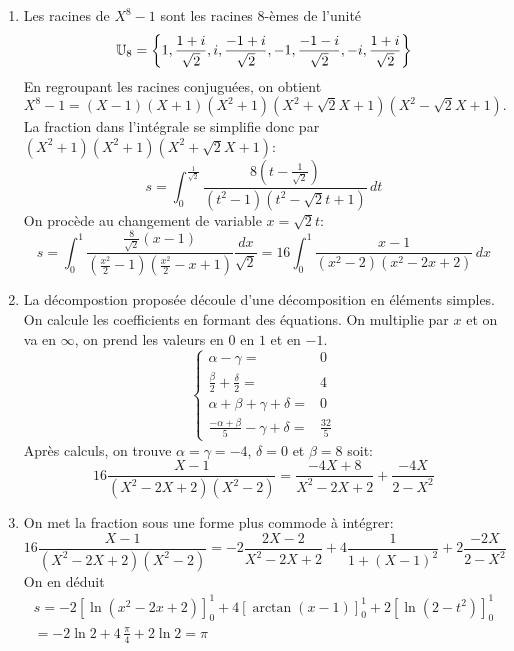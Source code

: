 \begin{enumerate}
 \item Les racines de $X^8 - 1$ sont les racines $8$-èmes de l'unité
\begin{displaymath}
 \mathbb{U}_8 = \left\lbrace 1, \frac{1+i}{\sqrt{2}}, i , \frac{-1+i}{\sqrt{2}}, -1, 
 \frac{-1-i}{\sqrt{2}}, -i, \frac{1+i}{\sqrt{2}}
 \right\rbrace 
\end{displaymath}
En regroupant les racines conjuguées, on obtient
\begin{displaymath}
 X^8 -1 = (X-1)(X+1)(X^2+1)(X^2 + \sqrt{2} X +1)(X^2 - \sqrt{2} X +1).
\end{displaymath}
La fraction dans l'intégrale se simplifie donc par $(X^2+1)(X^2+1)(X^2 + \sqrt{2} X +1)$:
\begin{displaymath}
 s=
\int_{0}^{\frac{1}{\sqrt{2}}} \frac{8(t-\frac{1}{\sqrt{2}})}{(t^2-1)(t^2 - \sqrt{2} t +1)}\,dt
\end{displaymath}
On procède au changement de variable $x = \sqrt{2}t$:
\begin{displaymath}
 s = \int_0^1 \frac{\frac{8}{\sqrt{2}}(x-1)}{(\frac{x^2}{2}-1)(\frac{x^2}{2} - x +1)}\frac{dx}{\sqrt{2}}
 = 16 \int_0^1 \frac{x-1}{(x^2-2)(x^2 -2x +2)}\,dx
\end{displaymath}

 \item La décompostion proposée découle d'une décomposition en éléments simples. On calcule les coefficients en formant des équations.
On multiplie par $x$ et on va en $\infty$, on prend les valeurs en $0$ en $1$ et en $-1$.
\begin{displaymath}
 \left\lbrace 
 \begin{aligned}
  \alpha - \gamma =& 0 \\
  \frac{\beta}{2} + \frac{\delta}{2} =& 4 \\
  \alpha + \beta + \gamma + \delta =& 0 \\
  \frac{-\alpha + \beta}{5} - \gamma + \delta =& \frac{32}{5}
 \end{aligned}
\right. 
\end{displaymath}
 Après calculs, on trouve $\alpha = \gamma = -4$, $\delta = 0$ et $\beta =8$ soit:
\begin{displaymath}
 16\frac{X - 1}{(X^2 - 2X + 2)(X^2 - 2)} = 
 \frac{-4 X +8}{X^2 - 2X + 2} 
 + \frac{-4 X }{2-X^2} 
\end{displaymath}

 \item On met la fraction sous une forme plus commode à intégrer:
\begin{displaymath}
 16\frac{X - 1}{(X^2 - 2X + 2)(X^2 - 2)} = 
 -2\frac{ 2X - 2}{X^2 - 2X + 2} + 4\frac{1}{1+(X-1)^2} 
 + 2\frac{-2 X }{2-X^2} 
\end{displaymath}
 On en déduit 
\begin{multline*}
s = 
-2 \left[ \ln(x^2-2x+2)\right]_0^1 
+ 4 \left[\arctan(x-1) \right]_0^1
+ 2 \left[ \ln(2-t^2)\right]_0^1 \\
= -2 \ln 2 + 4\, \frac{\pi}{4} +2 \ln 2 = \pi
\end{multline*}

 
\end{enumerate}
